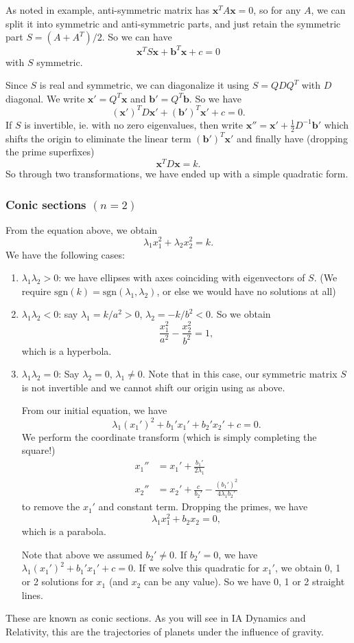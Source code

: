 \documentclass[a4paper]{article}
\begin{document}
As noted in example, anti-symmetric matrix has $\mathbf{x}^TA\mathbf{x} = 0$, so for any $A$, we can split it into symmetric and anti-symmetric parts, and just retain the symmetric part $S = (A + A^T)/2$. So we can have
\[
  \mathbf{x}^T S\mathbf{x} + \mathbf{b}^T\mathbf{x} + c = 0
\]
with $S$ symmetric.

Since $S$ is real and symmetric, we can diagonalize it using $S = QDQ^T$ with $D$ diagonal. We write $\mathbf{x}' = Q^T \mathbf{x}$ and $\mathbf{b}' = Q^T \mathbf{b}$. So we have
\[
  (\mathbf{x}')^TD\mathbf{x}' + (\mathbf{b}')^T \mathbf{x}' + c = 0.
\]
If $S$ is invertible, ie. with no zero eigenvalues, then write $\mathbf{x}'' = \mathbf{x}' + \frac{1}{2}D^{-1}\mathbf{b}'$ which shifts the origin to eliminate the linear term $(\mathbf{b}')^T\mathbf{x}'$ and finally have (dropping the prime superfixes)
\[
  \mathbf{x}^TD\mathbf{x} = k.
\]
So through two transformations, we have ended up with a simple quadratic form.

\subsubsection{Conic sections \texorpdfstring{$(n = 2)$}{(n = 2)}}
From the equation above, we obtain
\[
  \lambda_1x_1^2 + \lambda_2x_2^2 = k.
\]
We have the following cases:
\begin{enumerate}
  \item $\lambda_1\lambda_2 > 0$: we have ellipses with axes coinciding with eigenvectors of $S$. (We require $\mathrm{sgn}(k) = \mathrm{sgn}(\lambda_1,\lambda_2)$, or else we would have no solutions at all)
  \item $\lambda_1\lambda_2 < 0$: say $\lambda_1 = k/a^2 > 0$, $\lambda_2 = -k/b^2 < 0$. So we obtain
    \[
      \frac{x_1^2}{a^2} - \frac{x_2^2}{b^2} = 1,
    \]
    which is a hyperbola.
  \item $\lambda_1\lambda_2 = 0$: Say $\lambda_2 = 0$, $\lambda_1\not= 0$. Note that in this case, our symmetric matrix $S$ is not invertible and we cannot shift our origin using as above.

    From our initial equation, we have
    \[
      \lambda_1(x_1')^2 + b_1'x_1' + b_2' x_2' + c = 0.
    \]
    We perform the coordinate transform (which is simply completing the square!)
    \begin{align*}
      x_1'' &= x_1' + \frac{b_1'}{2\lambda_1}\\
      x_2'' &= x_2' + \frac{c}{b_2'} - \frac{(b_1')^2}{4\lambda_1b_2'}
    \end{align*}
    to remove the $x_1'$ and constant term. Dropping the primes, we have
    \[
      \lambda_1 x_1^2 + b_2 x_2 = 0,
    \]
    which is a parabola.

    Note that above we assumed $b_2'\not= 0$. If $b_2' = 0$, we have $\lambda_1(x_1')^2 + b_1' x_1' + c = 0$. If we solve this quadratic for $x_1'$, we obtain 0, 1 or 2 solutions for $x_1$ (and $x_2$ can be any value). So we have 0, 1 or 2 straight lines.
\end{enumerate}
These are known as conic sections. As you will see in IA Dynamics and Relativity, this are the trajectories of planets under the influence of gravity.
\end{document}
